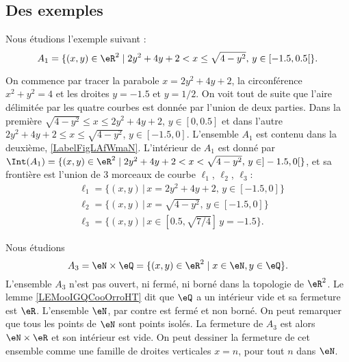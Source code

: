 

\subsection{Des exemples}


\begin{example}
	Nous étudions l'exemple suivant :
	\begin{equation}
		A_1 = \{ (x, y ) \in \eR^2 \; | \; 2y^2+4y+2<x\leq \sqrt{4- y^2},\, y\in [-1.5, 0.5[ \}.
	\end{equation}

	On commence par tracer la parabole \( x=2y^2+4y+2\), la circonférence \( x^2+y^2=4\) et les droites \( y=-1.5\) et \( y=1/2\). On voit tout de suite que l'aire délimitée par les quatre courbes est donnée par l'union de deux parties. Dans la première \( \sqrt{4- y^2}\leq x\leq 2y^2+4y+2\), \( y\in [0,0.5]\) et dans l'autre \( 2y^2+4y+2\leq x\leq \sqrt{4- y^2}\), \( y\in [-1.5, 0]\). L'ensemble \( A_1\) est contenu dans la deuxième, \ref{LabelFigLAfWmaN}. L'intérieur de \( A_1\) est donné par \( \Int(A_1) = \{ (x, y ) \in \eR^2 \; | \; 2y^2+4y+2<x< \sqrt{4- y^2},\, y\in ]-1.5, 0[ \}\), et sa frontière est l'union de 3 morceaux de courbe \( \ell_1\), \( \ell_2\), \( \ell_3\):
	\begin{equation}
		\begin{aligned}
			 & \ell_1=\{(x,y)\, |\, x=2y^2+4y+2,\, y\in [-1.5, 0] \}    \\
			 & \ell_2=\{(x,y)\, |\, x=\sqrt{4-y^2},\, y\in [-1.5, 0] \} \\
			 & \ell_3=\{(x,y)\, |\, x\in [0.5, \sqrt{7/4}]\, y=-1.5 \}.
		\end{aligned}
	\end{equation}

	\newcommand{\CaptionFigLAfWmaN}{}
	
\end{example}

\begin{example}     \label{EXooEJWBooDjBfKV}
	Nous étudions
	\begin{equation}
		A_3 = \eN \times \eQ = \{ (x, y ) \in \eR^2 \; | \; x \in \eN , y \in \eQ \}.
	\end{equation}
	L'ensemble \( A_3\) n'est pas ouvert, ni fermé, ni borné dans la topologie de \( \eR^2\). Le lemme \ref{LEMooIGQCooOrroHT} dit que \( \eQ\) a un intérieur vide et sa fermeture est \( \eR\). L'ensemble \( \eN\), par contre est fermé et non borné. On peut remarquer que tous les points de \( \eN\) sont points isolés. La fermeture de \( A_3\) est alors \( \eN\times \eR\) et son intérieur est vide. On peut dessiner la fermeture de cet ensemble comme une famille de droites verticales \( x=n\), pour tout \( n\) dans \( \eN\).
\end{example}


